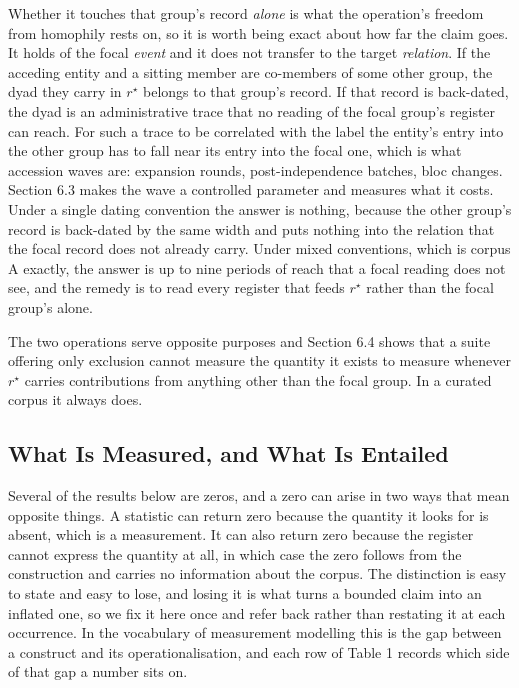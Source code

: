 \documentclass[twoside,11pt]{article}
\begin{document}
Whether it touches that group's record \emph{alone} is what the operation's freedom from homophily rests on, so it is worth being exact about how far the claim goes. It holds of the focal \emph{event} and it does not transfer to the target \emph{relation}. If the acceding entity and a sitting member are co-members of some other group, the dyad they carry in \(r^{\star}\) belongs to that group's record. If that record is back-dated, the dyad is an administrative trace that no reading of the focal group's register can reach. For such a trace to be correlated with the label the entity's entry into the other group has to fall near its entry into the focal one, which is what accession waves are: expansion rounds, post-independence batches, bloc changes. Section 6.3 makes the wave a controlled parameter and measures what it costs. Under a single dating convention the answer is nothing, because the other group's record is back-dated by the same width and puts nothing into the relation that the focal record does not already carry. Under mixed conventions, which is corpus A exactly, the answer is up to nine periods of reach that a focal reading does not see, and the remedy is to read every register that feeds \(r^{\star}\) rather than the focal group's alone.

The two operations serve opposite purposes and Section 6.4 shows that a suite offering only exclusion cannot measure the quantity it exists to measure whenever \(r^{\star}\) carries contributions from anything other than the focal group. In a curated corpus it always does.

\subsection{What Is Measured, and What Is Entailed}

Several of the results below are zeros, and a zero can arise in two ways that mean opposite things. A statistic can return zero because the quantity it looks for is absent, which is a measurement. It can also return zero because the register cannot express the quantity at all, in which case the zero follows from the construction and carries no information about the corpus. The distinction is easy to state and easy to lose, and losing it is what turns a bounded claim into an inflated one, so we fix it here once and refer back rather than restating it at each occurrence. In the vocabulary of measurement modelling \citep{jacobs} this is the gap between a construct and its operationalisation, and each row of Table 1 records which side of that gap a number sits on.
\end{document}
